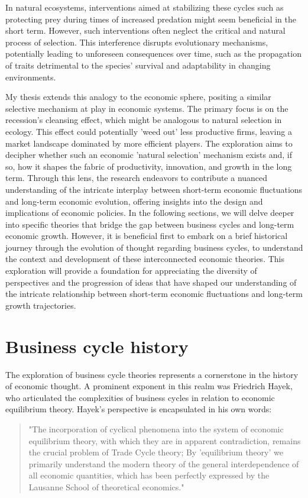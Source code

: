 \documentclass[12pt]{article}
\begin{document}
In natural ecosystems, interventions aimed at stabilizing these cycles  such as protecting prey during times of
increased predation  might seem beneficial in the short term. However, such interventions often neglect the critical and
natural process of selection. This interference disrupts evolutionary mechanisms, potentially leading to unforeseen
consequences over time, such as the propagation of traits detrimental to the species' survival and adaptability in
changing environments. 

My thesis extends this analogy to the economic sphere, positing a similar selective mechanism at play in economic
systems. The primary focus is on the recession's cleansing effect, which might be analogous to natural selection in
ecology. This effect could potentially 'weed out' less productive firms, leaving a market landscape dominated by more
efficient players. The exploration aims to decipher whether such an economic 'natural selection' mechanism exists and,
if so, how it shapes the fabric of productivity, innovation, and growth in the long term. Through this lens, the
research endeavors to contribute a nuanced understanding of the intricate interplay between short-term economic
fluctuations and long-term economic evolution, offering insights into the design and implications of economic policies. 
In the following sections, we will delve deeper into specific theories that bridge the gap between business cycles and
long-term economic growth. However, it is beneficial first to embark on a brief historical journey through the evolution
of thought regarding business cycles, to understand the context and development of these interconnected economic
theories. This exploration will provide a foundation for appreciating the diversity of perspectives and the progression
of ideas that have shaped our understanding of the intricate relationship between short-term economic fluctuations and
long-term growth trajectories. 

\section{Business cycle history}

The exploration of business cycle theories represents a cornerstone in the history of economic thought. A prominent
exponent in this realm was Friedrich Hayek, who articulated the complexities of business cycles in relation to economic
equilibrium theory. Hayek's perspective is encapsulated in his own words: 

\begin{quote}
    "The incorporation of cyclical phenomena into the system of economic equilibrium theory, with which they are in
    apparent contradiction, remains the crucial problem of Trade Cycle theory; 
    By 'equilibrium theory' we primarily understand the modern theory of the general interdependence of all economic
    quantities, which has been perfectly expressed by the Lausanne School of theoretical economics." \cite{Hay33} 
\end{quote}
\end{document}
